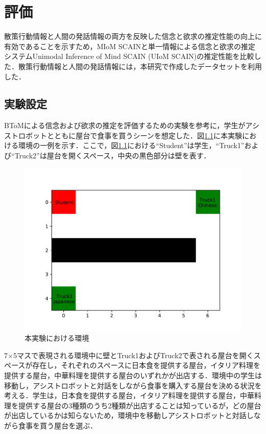 \chapter{評価}
\par
散策行動情報と人間の発話情報の両方を反映した信念と欲求の推定性能の向上に有効であることを示すため，MIoM SCAINと単一情報による信念と欲求の推定システムUnimodal Inference of Mind SCAIN (UIoM SCAIN)の推定性能を比較した．散策行動情報と人間の発話情報には，本研究で作成したデータセットを利用した．


\section{実験設定}
\par
BToMによる信念および欲求の推定を評価するための実験を参考に，学生がアシストロボットとともに屋台で食事を買うシーンを想定した．図\ref{fig:ex_env1}に本実験における環境の一例を示す．ここで，図\ref{fig:ex_env1}における``Student''は学生，``Truck1''および``Truck2''は屋台を開くスペース，中央の黒色部分は壁を表す．
\begin{figure}[htbp]
  \begin{center}
    \includegraphics[scale=0.7]{./ex_env1.pdf}
    \caption{本実験における環境}
    \label{fig:ex_env1}
  \end{center}
\end{figure}
7$\times$5マスで表現される環境中に壁とTruck1およびTruck2で表される屋台を開くスペースが存在し，それぞれのスペースに日本食を提供する屋台，イタリア料理を提供する屋台，中華料理を提供する屋台のいずれかが出店する．環境中の学生は移動し，アシストロボットと対話をしながら食事を購入する屋台を決める状況を考える．学生は，日本食を提供する屋台，イタリア料理を提供する屋台，中華料理を提供する屋台の3種類のうち2種類が出店することは知っているが，どの屋台が出店しているかは知らないため，環境中を移動しアシストロボットと対話しながら食事を買う屋台を選ぶ．
